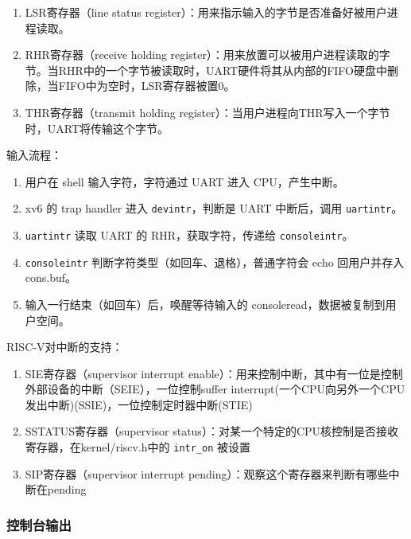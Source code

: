 \begin{enumerate}
	\item LSR寄存器（line status register）：用来指示输入的字节是否准备好被用户进程读取。
	
	\item RHR寄存器（receive holding register）：用来放置可以被用户进程读取的字节。当RHR中的一个字节被读取时，UART硬件将其从内部的FIFO硬盘中删除，当FIFO中为空时，LSR寄存器被置0。
	
	\item THR寄存器（transmit holding register）：当用户进程向THR写入一个字节时，UART将传输这个字节。
\end{enumerate}

输入流程：

\begin{enumerate}
	\item 用户在 shell 输入字符，字符通过 UART 进入 CPU，产生中断。
	\item xv6 的 trap handler 进入 \texttt{devintr}，判断是 UART 中断后，调用 \texttt{uartintr}。
	\item \texttt{uartintr} 读取 UART 的 RHR，获取字符，传递给 \texttt{consoleintr}。
	\item \texttt{consoleintr} 判断字符类型（如回车、退格），普通字符会 echo 回用户并存入 cons.buf。
	\item 输入一行结束（如回车）后，唤醒等待输入的 consoleread，数据被复制到用户空间。
\end{enumerate}

RISC-V对中断的支持：

\begin{enumerate}
	\item SIE寄存器（supervisor interrupt enable）：用来控制中断，其中有一位是控制外部设备的中断（SEIE），一位控制suffer interrupt(一个CPU向另外一个CPU发出中断)(SSIE)，一位控制定时器中断(STIE)
	
	\item SSTATUS寄存器（supervisor status）：对某一个特定的CPU核控制是否接收寄存器，在kernel/riscv.h中的 \texttt{intr\_on} 被设置
	
	\item SIP寄存器（supervisor interrupt pending）：观察这个寄存器来判断有哪些中断在pending
\end{enumerate}

\subsubsection{控制台输出}

